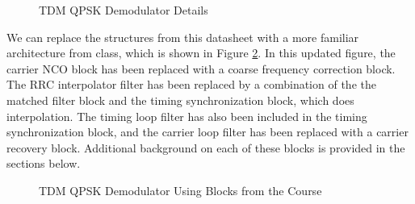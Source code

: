\documentclass[conference,onecolumn]{IEEEtran}
\begin{document}
\begin{figure}[H]
	\centerline{}
	\caption{TDM QPSK Demodulator Details \cite{alldatasheetcom_2015_sta400a}}
	\label{fig::TDM_receiver_STA400}
\end{figure}

We can replace the structures from this datasheet with a more familiar architecture from class, which is shown in Figure \ref{fig::tdm_receiver_architecture}. In this updated figure, the carrier NCO block has been replaced with a coarse frequency correction block. The RRC interpolator filter has been replaced by a combination of the the matched filter block and the timing synchronization block, which does interpolation. The timing loop filter has also been included in the timing synchronization block, and the carrier loop filter has been replaced with a carrier recovery block. Additional background on each of these blocks is provided in the sections below.


\begin{figure}[H]
	\centerline{}
	\caption{TDM QPSK Demodulator Using Blocks from the Course}
	\label{fig::tdm_receiver_architecture}
\end{figure}

\end{document}
